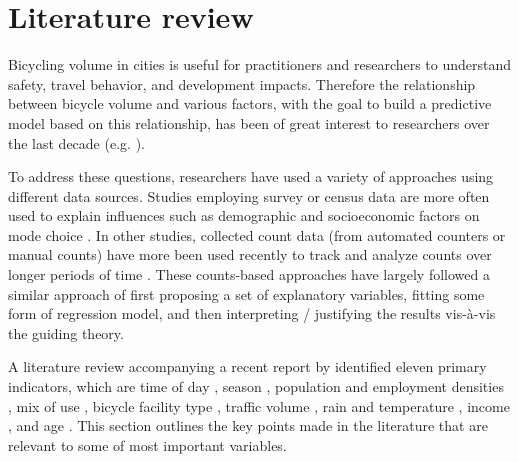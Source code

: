 \documentclass[12pt,letterpaper,article,twocolumn]{memoir}
\begin{document}
\section*{Literature review}
% 
% 

Bicycling volume in cities is useful for practitioners and researchers
to understand safety, travel behavior, and development impacts.
Therefore the relationship between bicycle volume and various factors,
with the goal to build a predictive model based on this relationship,
has been of great interest to researchers over the last decade (e.g.
\cite{Griswold:2011aa,Fields:2012aa,Niemeier:1996aa,Nosal:2014aa}).

To address these questions, researchers have used a variety of
approaches using different data sources. Studies employing survey or
census data are more often used to explain influences such as
demographic and socioeconomic factors on mode choice
\parencite{Parkin:2008aa,Helbich:2014aa}. In other studies, collected
count data (from automated counters or manual counts) have more been
used recently to track and analyze counts over longer periods of
time \parencite{Griswold:2011aa,Nosal:2014aa}. These counts-based
approaches have largely followed a similar approach of first proposing
a set of explanatory variables, fitting some form of regression model,
and then interpreting / justifying the results vis-\`{a}-vis the
guiding theory.

A literature review accompanying a recent report by
\textcite{Bassok:2011aa} identified eleven primary indicators, which are
time of day \parencite{Schwartz:1999aa}, season \parencite{Niemeier:1996aa},
population and employment densities
\parencite{McCahil:2008aa,Pinjari:2009aa}, mix of use
\parencite{Pinjari:2009aa}, bicycle facility type \parencite{Hunt:2007aa},
traffic volume \parencite{McDonald:2007aa}, rain and temperature
\parencite{Niemeier:1996aa,Parkin:2008aa},
income \parencite{Turner:1998aa}, and age \parencite{Hunt:2007aa}.
This section outlines the key points made in the literature that are
relevant to some of most important variables.
\end{document}
